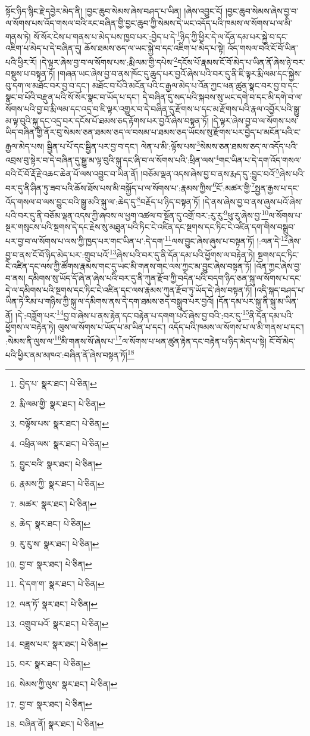སྟོང་ཉིད་སྙིང་རྗེ་དབྱེར་མེད་ནི། །བྱང་ཆུབ་སེམས་ཞེས་བཤད་པ་ཡིན། །ཞེས་འབྱུང་ངོ། །བྱང་ཆུབ་སེམས་ཞེས་བྱ་བ་ལ་སོགས་པས་འོད་གསལ་བའི་རང་བཞིན་གྱི་བྱང་ཆུབ་ཀྱི་སེམས་དེ་ཡང་འདོད་པའི་ཁམས་ལ་སོགས་པ་ལ་མི་གནས་ཏེ། སོ་སོར་ངེས་པ་གནས་པ་མེད་པས་ཁྱབ་པར་:བྱེད་པ་དེ་\footnote{བྱེད་པ་  སྣར་ཐང་།  པེ་ཅིན། }ཉིད་ཀྱི་ཕྱིར་དེ་ལ་དོན་དམ་པར་སྐྱེ་བ་དང་འཇིག་པ་མེད་པ་དེ་བཞིན་དུ། ཆོས་ཐམས་ཅད་ལ་ཡང་སྐྱེ་བ་དང་འཇིག་པ་མེད་པ་སྟེ། འོད་གསལ་བའི་ངོ་བོ་ཡིན་པའི་ཕྱིར་རོ། །དེ་ལྟར་ཞེས་བྱ་བ་ལ་སོགས་པས་:རྨི་ལམ་གྱི་དཔེས་\footnote{རྨི་ལམ་གྱི་  སྣར་ཐང་།  པེ་ཅིན། }དངོས་པོ་རྣམས་ངོ་བོ་མེད་པ་ཡིན་ནོ་ཞེས་ཉེ་བར་བསྡུས་པ་བསྟན་ཏོ། །གཞན་ཡང་ཞེས་བྱ་བ་ནས་ཁོང་དུ་ཆུད་པར་བྱའོ་ཞེས་པའི་བར་དུ་ནི་ཇི་ལྟར་རྨི་ལམ་དང་སྐྱེས་བུ་དག་ལ་མཐོང་བར་བྱ་བ་དང་། མཐོང་བ་པོའི་མངོན་པའི་ང་རྒྱལ་མེད་པ་འོན་ཀྱང་ཕན་ཚུན་སྣང་བར་བྱ་བ་དང་སྣང་བ་པོའི་བརྫུན་པའི་སོ་སོར་སྣང་བ་ཡོད་པ་དང་། དེ་བཞིན་དུ་སད་པའི་སྐབས་སུ་ཡང་དགེ་བ་དང་མི་དགེ་བ་ལ་སོགས་པའི་བྱ་བ་རྨི་ལམ་དང་འདྲ་བ་ཇི་ལྟར་འགྱུར་བ་དེ་བཞིན་དུ་རྫོགས་པ་དང་མ་རྫོགས་པའི་རྣལ་འབྱོར་པའི་སྒྱུ་མ་ལྟ་བུའི་སྐུ་དང་འདྲ་བར་དངོས་པོ་ཐམས་ཅད་རྟོགས་པར་བྱའོ་ཞེས་བསྟན་ཏོ། །དེ་ལྟར་ཞེས་བྱ་བ་ལ་སོགས་པས་ཡིད་བཞིན་གྱི་ནོར་བུ་སེམས་ཅན་ཐམས་ཅད་ལ་བསམ་པ་ཐམས་ཅད་ཡོངས་སུ་རྫོགས་པར་བྱེད་པ་མངོན་པའི་ང་རྒྱལ་མེད་པས། སྦྱིན་པ་པོ་དང་སྦྱིན་པར་བྱ་བ་དང་། ལེན་པ་མི་:ལྟོས་པས་\footnote{བལྟོས་པས་  སྣར་ཐང་།  པེ་ཅིན། }སེམས་ཅན་ཐམས་ཅད་ལ་འདོད་པའི་འབྲས་བུ་སྟེར་བ་དེ་བཞིན་དུ་སྒྱུ་མ་ལྟ་བུའི་སྐུ་དང་ཞི་བ་ལ་སོགས་པའི་:ཕྲིན་ལས་\footnote{འཕྲིན་ལས་  སྣར་ཐང་།  པེ་ཅིན། }གང་ཡིན་པ་དེ་དག་འོད་གསལ་བའི་ངོ་བོ་རྡོ་རྗེ་འཆང་ཆེན་པོ་ལས་འབྱུང་བ་ཡིན་ནོ། །བཅོམ་ལྡན་འདས་ཞེས་བྱ་བ་ནས་རྨད་དུ་:བྱུང་བའོ་\footnote{བྱུང་བའི་  སྣར་ཐང་།  པེ་ཅིན། }ཞེས་པའི་བར་དུ་ནི་ཤིན་ཏུ་ཟབ་པའི་ཆོས་ཐོས་པས་མི་བསྐྱོད་པ་ལ་སོགས་པ་:རྣམས་ཀྱིས་\footnote{རྣམས་ཀྱི་  སྣར་ཐང་།  པེ་ཅིན། }ངོ་:མཚར་གྱི་\footnote{མཚར་  སྣར་ཐང་།  པེ་ཅིན། }སྤྱན་རྒྱས་པ་དང་འོད་གསལ་བ་ལས་བྱུང་བའི་སྒྱུ་མའི་སྐུ་ལ་:ཆེད་དུ་\footnote{ཆེད་  སྣར་ཐང་།  པེ་ཅིན། }བརྗོད་པ་ཉིད་བསྟན་ཏོ། །དེ་ནས་ཞེས་བྱ་བ་ནས་ཞུས་པའོ་ཞེས་པའི་བར་དུ་ནི་བཅོམ་ལྡན་འདས་ཀྱི་ཞབས་ལ་ཕྱག་འཚལ་བ་སྔོན་དུ་འགྲོ་བར་:རུ་རུ་\footnote{རུ་རུ་ས་  སྣར་ཐང་།  པེ་ཅིན། }ཕུ་རུ་ཞེས་བྱ་\footnote{བྱ་བ་  སྣར་ཐང་།  པེ་ཅིན། }ལ་སོགས་པ་སྔར་གསུངས་པའི་སྔགས་དེ་དང་རྗེས་སུ་མཐུན་པའི་ཏིང་ངེ་འཛིན་དང་སྔགས་དང་ཏིང་ངེ་འཛིན་དག་གིས་བསྒྲུབ་པར་བྱ་བ་ལ་སོགས་པ་ལས་ཀྱི་ཁྱད་པར་གང་ཡིན་པ་:དེ་དག་\footnote{དེ་དག་ག་  སྣར་ཐང་།  པེ་ཅིན། }ལས་བྱུང་ཞེས་ཞུས་པ་བསྟན་ཏོ། །:ལན་དེ་\footnote{ལན་ཏོ་  སྣར་ཐང་།  པེ་ཅིན། }ཞེས་བྱ་བ་ནས་ངོ་བོ་ཉིད་མེད་པར་:གྲུབ་པའོ་\footnote{འགྲུབ་པའོ་  སྣར་ཐང་།  པེ་ཅིན། }ཞེས་པའི་བར་དུ་ནི་དོན་དམ་པའི་ཕྱོགས་ལ་བརྟེན་ཏེ། སྔགས་དང་ཏིང་ངེ་འཛིན་དང་ལས་ཀྱི་ཚོགས་རྣམས་གང་དུ་ཡང་མི་གནས་གང་ལས་ཀྱང་མ་བྱུང་ཞེས་བསྟན་ཏོ། །འོན་ཀྱང་ཞེས་བྱ་བ་ནས། དམིགས་སུ་ཡོད་དོ་ཞེ་ན་ཞེས་པའི་བར་དུ་ནི་ཀུན་རྫོབ་ཀྱི་བདེན་པའི་བདག་ཉིད་ཅན་སྐུ་ལ་སོགས་པ་དང་དེ་ལ་དམིགས་པའི་སྔགས་དང་ཏིང་ངེ་འཛིན་དང་ལས་རྣམས་ཀུན་རྫོབ་ཏུ་ཡོད་དེ་ཞེས་བསྟན་ཏོ། །འདི་སྐད་བཤད་པ་ཡིན་ཏེ་རིམ་པ་གཉིས་ཀྱི་སྐུ་ལ་དམིགས་ནས་དེ་དག་ཐམས་ཅད་བསྒྲུབ་པར་བྱའོ། །དོན་དམ་པར་སྐུ་ནི་སྐུ་མ་ཡིན་ནོ། །དེ་:བཟློག་པར་\footnote{བཟླས་པར་  སྣར་ཐང་།  པེ་ཅིན། }བྱ་བ་ཞེས་པ་ནས་རྟེན་དང་བརྟེན་པ་དགག་པའོ་ཞེས་བྱ་བའི་:བར་དུ་\footnote{བར་  སྣར་ཐང་།  པེ་ཅིན། }ནི་དོན་དམ་པའི་ཕྱོགས་ལ་བརྟེན་ཏེ། ལུས་ལ་སོགས་པ་ཡོད་པ་མ་ཡིན་པ་དང་། འདོད་པའི་ཁམས་ལ་སོགས་པ་ལ་མི་གནས་པ་དང་། :སེམས་ནི་ལུས་ལ་\footnote{སེམས་ཀྱི་ལུས་  སྣར་ཐང་།  པེ་ཅིན། }མི་གནས་སོ་ཞེས་པ་\footnote{བྱ་བ་  སྣར་ཐང་།  པེ་ཅིན། }ལ་སོགས་པ་ཕན་ཚུན་རྟེན་དང་བརྟེན་པ་ཉིད་མེད་པ་སྟེ། ངོ་བོ་མེད་པའི་ཕྱིར་ནམ་མཁའ་:བཞིན་ནོ་ཞེས་བསྟན་ཏོ།\footnote{བཞིན་ནོ།  སྣར་ཐང་།  པེ་ཅིན། } 